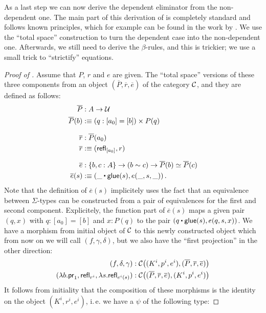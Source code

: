 As a last step we can now derive the dependent eliminator from the non-dependent one.
The main part of this derivation of  is completely
standard and follows known principles,
which for example can be found in the work by \cite{awodeyGamSoja_hoAlgs}.
We use the ``total space'' construction to turn the dependent case into the
non-dependent one.
Afterwards, we still need to derive the $\beta$-rules, and this is trickier;
we use a small trick to ``strictify'' equations.

\begin{proof}[Proof of ]
Assume that $P$, $r$ and $e$ are given.
The ``total space'' versions of these three components from an object
$(\overline P, \overline r, \overline e)$ of the category $\mathcal C$, and they
are defined as follows:
\begin{align*}
  \overline P &: A \to \UU \\
  \overline P(b) &:\equiv (q : [a_0] = [b]) \times P(q) \\[.7em]
  \overline r &: \overline{P}(a_0) \\
  \overline r &:\equiv (\refl_{[a_0]}, r) \\[.7em]
  \overline e &: \{b,c : A\} \to (b \sim c) \to \overline P(b) \simeq \overline P(c) \\
  \overline e (s) &:\equiv \left(\_ \ct \glue(s), e(\_,s,\_)\right). %
\end{align*}
Note that the definition of $\overline e (s)$ implicitely uses the fact that
an equivalence between $\Sigma$-types can be constructed from a pair of
equivalences for the first and second component.
Explicitely, the function part of $\overline e (s)$ maps a given pair
$(q, x)$ with $q : [a_0] = [b]$ and $x : P(q)$
to the pair $(q \ct \glue(s), e(q,s,x))$.
We have a morphism from initial object of $\mathcal C$ to this newly constructed object
which from now on we will call $(f, \gamma, \delta)$,
but we also have the ``first projection'' in the other direction:
 \begin{align}
  (f,\delta,\gamma) &: \mathcal C\big((K^i,p^i,e^i),(\overline P, \overline r, \overline e)\big)  \label{eq:morphism-from-initial} \\
  (\lambda b. \mathsf{pr}_1,\mathsf{refl}_{r^i},\lambda s. \mathsf{refl}_{e^i(s)}) &: \mathcal C\big((\overline P, \overline r, \overline e),(K^i,p^i,e^i)\big)
 \end{align}
It follows from initiality that the composition of these morphisms is the
identity on the object $(K^i, r^i, e^i)$,
i.\,e. we have a $\psi$ of the following type:

\end{proof}

